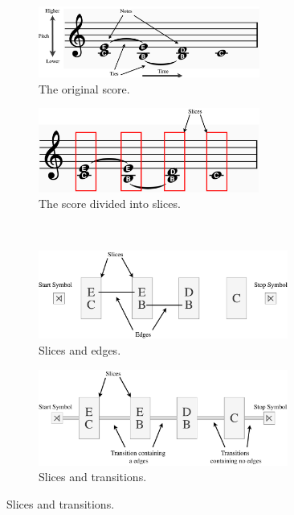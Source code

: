 \documentclass[12pt,a4paper,twoside,openany]{report} \usepackage[pdfborder={0 0 0}]{hyperref}    %
\theoremstyle{definition} \newtheorem{definition}{Definition}[section]
\begin{document}
  \begin{figure}[ht] 
    \centering 
    \begin{subfigure}[t]{0.49\textwidth}
      \centering 
      \includegraphics[width=0.8\textwidth]{figs/prep/sliceRep/surface.png}
      \caption{The original score.}
      \label{fig:sliceRepSurface}
    \end{subfigure}
    \hfill
    \begin{subfigure}[t]{0.49\textwidth}
      \includegraphics[width=0.8\textwidth]{figs/prep/sliceRep/slicedSurface.png}
      \caption{The score divided into slices.}
      \label{fig:sliceRepSlicedSurface}
    \end{subfigure}\\
    \begin{subfigure}[t]{0.49\textwidth}
      \includegraphics[width=0.9\textwidth]{figs/prep/sliceRep/slicesEdges.png}
      \caption{Slices and edges.}
      \label{fig:sliceRepSlicesEdges}
    \end{subfigure}
    \hfill
    \begin{subfigure}[t]{0.49\textwidth}
      \includegraphics[width=0.9\textwidth]{figs/prep/sliceRep/sliceTransitions.pdf}
      \caption{Slices and transitions.}
      \label{fig:sliceRepTransitions}
    \end{subfigure}
    \label{fig:sliceRepresentation} 
  \end{figure}
\end{document}
